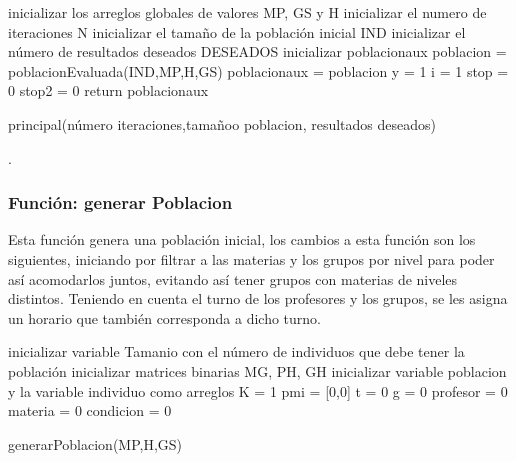 \begin{algorithm}[H]
	\DontPrintSemicolon
	\SetAlgoLined
	inicializar los arreglos globales de valores MP, GS y H\;
	inicializar el numero de iteraciones N\;
	inicializar el tamaño de la población inicial IND\;
	inicializar el número de resultados deseados DESEADOS\;
	inicializar poblacionaux\;
	poblacion = poblacionEvaluada(IND,MP,H,GS)\;
	poblacionaux = poblacion\;
	y = 1\;
	i = 1\;
	stop = 0\;
	stop2 = 0\;
	return poblacionaux\;
	\caption{principal(número iteraciones,tamañoo poblacion, resultados deseados)}
\end{algorithm}

.

\subsubsection{Funci\'on: generar Poblacion}

Esta función genera una población inicial, los cambios a esta función son los siguientes, iniciando por filtrar a las materias y los grupos por nivel para poder así acomodarlos juntos, evitando así tener grupos con materias de niveles distintos. Teniendo en cuenta el turno de los profesores y los grupos, se les asigna un horario que también corresponda a dicho turno.\\

\begin{algorithm}[H]
	\DontPrintSemicolon
	\SetAlgoLined
	inicializar variable Tamanio con el n\'umero de individuos que debe tener la poblaci\'on\;
	inicializar matrices binarias MG, PH, GH\;
	inicializar variable poblacion y la variable individuo como arreglos\;
	K = 1\;
	pmi = [0,0] \;
	t = 0\;
	g = 0\;
	profesor = 0\;
	materia = 0\;
	condicion = 0\;
	
	\caption{generarPoblacion(MP,H,GS)}
\end{algorithm}

